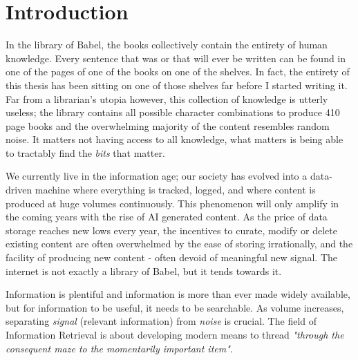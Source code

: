\chapter{Introduction}


In the library of Babel, the books collectively contain the entirety of human knowledge. Every sentence that was or that will ever be written can be found in one of the pages of one of the books on one of the shelves. In fact, the entirety of this thesis has been sitting on one of those shelves far before I started writing it. Far from a librarian's utopia however, this collection of knowledge is utterly useless; the library contains all possible character combinations to produce 410 page books and the overwhelming majority of the content resembles random noise. It matters not having access to all knowledge, what matters is being able to tractably find the \textit{bits} that matter.


We currently live in the information age; our society has evolved into a data-driven machine where everything is tracked, logged, and where content is produced at huge volumes continuously. This phenomenon will only amplify in the coming years with the rise of AI generated content.
As the price of data storage reaches new lows every year, the incentives to curate, modify or delete existing content are often overwhelmed by the ease of storing irrationally, and the facility of producing new content - often devoid of meaningful new signal. The internet is not exactly a library of Babel, but it tends towards it.

Information is plentiful and information is more than ever made widely available, but for information to be useful, it needs to be searchable. As volume increases, separating \emph{signal} (relevant information) from \emph{noise} is crucial. The field of Information Retrieval is about developing modern means to thread \emph{"through the consequent maze to the momentarily important item"}.


